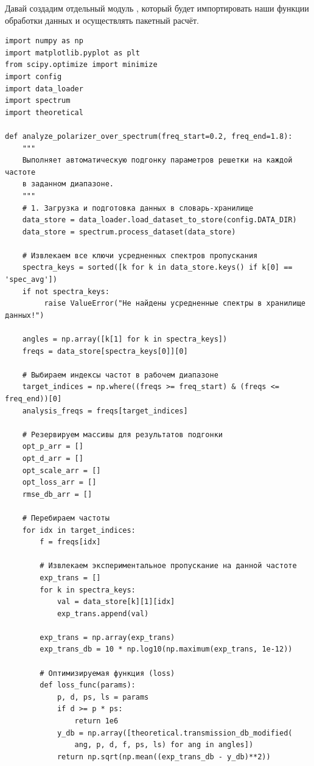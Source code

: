 Давай создадим отдельный модуль , который будет импортировать наши функции обработки данных и осуществлять пакетный расчёт.

\begin{listing}[H]
	\caption{Пакетная оптимизация параметров по спектру ()}
\begin{verbatim}
import numpy as np
import matplotlib.pyplot as plt
from scipy.optimize import minimize
import config
import data_loader
import spectrum
import theoretical

def analyze_polarizer_over_spectrum(freq_start=0.2, freq_end=1.8):
    """
    Выполняет автоматическую подгонку параметров решетки на каждой частоте
    в заданном диапазоне.
    """
    # 1. Загрузка и подготовка данных в словарь-хранилище
    data_store = data_loader.load_dataset_to_store(config.DATA_DIR)
    data_store = spectrum.process_dataset(data_store)
    
    # Извлекаем все ключи усредненных спектров пропускания
    spectra_keys = sorted([k for k in data_store.keys() if k[0] == 'spec_avg'])
    if not spectra_keys:
         raise ValueError("Не найдены усредненные спектры в хранилище данных!")
         
    angles = np.array([k[1] for k in spectra_keys])
    freqs = data_store[spectra_keys[0]][0]
    
    # Выбираем индексы частот в рабочем диапазоне
    target_indices = np.where((freqs >= freq_start) & (freqs <= freq_end))[0]
    analysis_freqs = freqs[target_indices]
    
    # Резервируем массивы для результатов подгонки
    opt_p_arr = []
    opt_d_arr = []
    opt_scale_arr = []
    opt_loss_arr = []
    rmse_db_arr = []
    
    # Перебираем частоты
    for idx in target_indices:
        f = freqs[idx]
        
        # Извлекаем экспериментальное пропускание на данной частоте
        exp_trans = []
        for k in spectra_keys:
            val = data_store[k][1][idx]
            exp_trans.append(val)
            
        exp_trans = np.array(exp_trans)
        exp_trans_db = 10 * np.log10(np.maximum(exp_trans, 1e-12))
        
        # Оптимизируемая функция (loss)
        def loss_func(params):
            p, d, ps, ls = params
            if d >= p * ps:
                return 1e6
            y_db = np.array([theoretical.transmission_db_modified(
                ang, p, d, f, ps, ls) for ang in angles])
            return np.sqrt(np.mean((exp_trans_db - y_db)**2))
        

\end{verbatim}
\end{listing}
